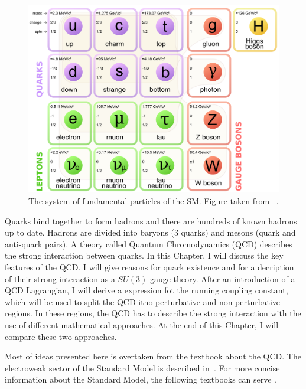 \begin{figure}[t]
  \centering
  \includegraphics[width=\textwidth]{Chapter1/SM.png} 
  \caption[The system of fundamental particles of the SM.]
          {The system of fundamental particles of the SM. Figure taken from~
            \cite{wiki:SMParticlesSource}.} \label{fig:SMparticles}
\end{figure}

Quarks bind together to form hadrons and there are hundreds
\cite{PDG2014} of known hadrons up to date. Hadrons are
divided into baryons (3 quarks) and mesons (quark and anti-quark pairs). 
A theory called Quantum Chromodynamics (QCD) describes the strong interaction
between quarks.  
In this Chapter, I will discuss the key features of the QCD. 
I will give reasons for quark existence and for a decription of their strong
interaction as a $SU(3)$ gauge theory. 
After an introduction of a QCD Lagrangian, I will derive a expression fot the
running coupling constant, which will be used to split the QCD itno perturbative
and non-perturbative regions. 
In these regions, the QCD has to describe the strong interaction with the use of
different mathematical approaches. 
At the end of this Chapter, I will compare
these two approaches.

Most of ideas presented here is overtaken from the textbook \cite{QCDTextbook}
about the QCD. 
The electroweak sector of the Standard Model is described
in~\cite{horejsi2002fundamentals}. 
For more concise information about the Standard Model, the following textbooks
can serve \cite{griffiths2008introduction,cottingham2007introduction}.

